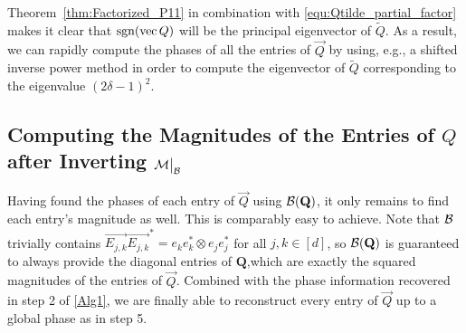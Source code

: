 Theorem~\ref{thm:Factorized_P11} in combination with \eqref{equ:Qtilde_partial_factor} makes it clear that $\operatorname{sgn} (\operatorname{vec}{Q})$ will be the principal eigenvector of $\widetilde{Q}$.  As a result, we can rapidly compute the phases of all the entries of $\vec{Q}$ by using, e.g., a shifted inverse power method \cite{trefethen1997numerical} in order to compute the eigenvector of $\widetilde{Q}$ corresponding to the eigenvalue $(2 \delta - 1)^2$. 

\subsection{Computing the Magnitudes of the Entries of $Q$ after Inverting $\mathcal{M} \big|_{\mathcal{B}}$}
\label{sec:Getmags}

Having found the phases of each entry of $\vec{Q}$ using $\mathcal{B} ( \mathbf{Q} )$, it only remains to find each entry's magnitude as well.  This is comparably easy to achieve.  Note that $\mathcal{B}$ trivially contains $\vec{E_{j,k}}\vec{E_{j,k}}^* = e_ke_k^* \otimes e_je_j^*$ for all $j, k \in [d]$, so $\mathcal{B} ( \mathbf{Q} )$ is guaranteed to always provide the diagonal entries of $\mathbf{Q}$,which are exactly the squared magnitudes of the entries of $\vec{Q}$.  Combined with the phase information recovered in step 2 of \ref{Alg1}, we are finally able to reconstruct every entry of $\vec{Q}$ up to a global phase as in step 5.
